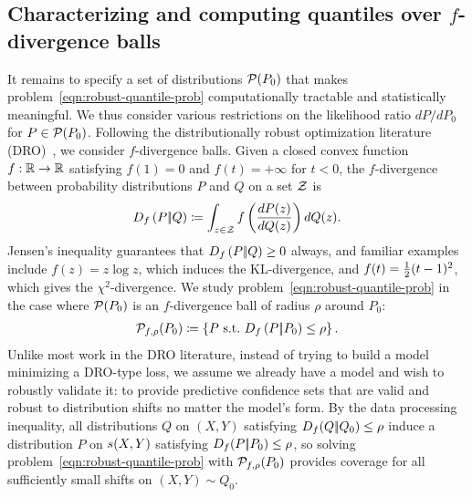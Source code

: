 \subsection{Characterizing and computing
  quantiles over $f$-divergence balls}
\label{sec:robust-coverage-div-balls}

It remains to specify a set of distributions $\mathcal{P}(P_0)$ that makes
problem~\eqref{eqn:robust-quantile-prob} computationally tractable and
statistically meaningful. We thus consider various restrictions on the
likelihood ratio $dP / dP_0$ for $P \in \mathcal{P}(P_0)$. Following the
distributionally robust optimization literature
(DRO)~\cite{ BlanchetMu19,
  DuchiNa21}, we consider $f$-divergence
balls. Given a closed convex function $f: \mathbb{R} \to \mathbb{R}$
satisfying $f(1)=0$ and $f(t) = +\infty$ for $t<0$,
the $f$-divergence~\cite{Csiszar67} between probability distributions
$P$ and $Q$ on a set $\mathcal{Z}$ is
\begin{equation*}
  D_{f}\left({P} |\!| {Q}\right) \coloneqq \int_{z \in \mathcal{Z}} f\left( \frac{dP(z)}{dQ(z)}
  \right) dQ(z).
\end{equation*}
Jensen's inequality guarantees that $D_{f}\left({P} |\!| {Q}\right) \ge 0$ always, and
familiar examples include $f(z) = z \log z$, which induces the KL-divergence,
and $f(t) = \frac{1}{2} (t - 1)^2$, which gives the $\chi^2$-divergence.
We study problem~\eqref{eqn:robust-quantile-prob} in the case where
$\mathcal{P}(P_0)$ is an $f$-divergence ball
of radius $\rho$ around $P_0$:
\begin{align}
  \label{eqn:P-constraint-set}
  \mathcal{P}_{f,\rho}(P_0) \coloneqq \left\{ P ~\mbox{s.t.}~
  D_{f}\left({P} |\!| {P_0}\right)  \le \rho \right\}.
\end{align}
Unlike most work in the DRO literature, instead of trying to build a
model minimizing a DRO-type loss, we assume we already have a model and wish
to robustly validate it: to
provide predictive confidence sets that are valid and robust to distribution
shifts no matter the model's form.
  By the data processing inequality, all distributions $Q$ on $(X,Y)$
  satisfying $D_{f}({Q} |\!| {Q_0}) \le \rho$ induce a
  distribution $P$ on $s(X, Y)$ satisfying $D_{f}({P} |\!| {P_0}) \le \rho$,
  so solving
  problem~\eqref{eqn:robust-quantile-prob} with $\mathcal{P}_{f,\rho}(P_0)$
  provides coverage for all sufficiently small shifts on
  $(X, Y) \sim Q_0$.

